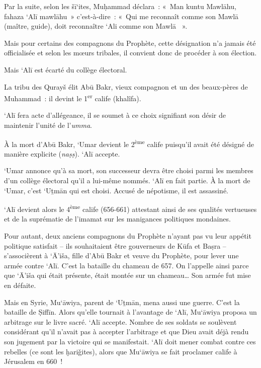 Par la suite, selon les šī`ites, Muḥammad déclara~: «~Man kuntu Mawlāhu,
fahaza `Alī mawlāhu~» c'est-à-dire~: «~Qui me reconnaît comme son Mawlā
(maître, guide), doit reconnaître `Ali comme son Mawlā ~».






Mais pour certains des compagnons du Prophète, cette désignation n'a
jamais été officialisée et selon les mœurs tribales, il convient donc de
procéder à son élection.

Mais `Alī est écarté du collège électoral.

La tribu des Qurayš élit Abū Bakr, vieux compagnon et un des beaux-pères
de Muhammad~: il devint le 1\textsuperscript{er} calife (khalîfa).

`Alī fera acte d'allégeance, il se soumet à ce choix signifiant son
désir de maintenir l'unité de l'\emph{umma}.

À la mort d'Abū Bakr, `Umar devient le 2\textsuperscript{ème} calife
puisqu'il avait été désigné de manière explicite (\emph{naṣṣ}). `Alī
accepte.

`Umar annonce qu'à sa mort, son successeur devra être choisi parmi les
membres d'un collège électoral qu'il a lui-même nommés. `Alī en fait
partie. À la mort de `Umar, c'est `Uṯmān qui est choisi. Accusé de
népotisme, il est assassiné.

`Alī devient alors le 4\textsuperscript{ème} calife (656-661) attestant
ainsi de ses qualités vertueuses et de la suprématie de l'imamat sur les
manigances politiques mondaines.

Pour autant, deux anciens compagnons du Prophète n'ayant pas vu leur
appétit politique satisfait -- ils souhaitaient être gouverneurs de Kūfa
et Baṣra -- s'associèrent à `Ā'iša, fille d'Abū Bakr et veuve du
Prophète, pour lever une armée contre `Alī. C'est la bataille du chameau
de 657. On l'appelle ainsi parce que `Ā'iša qui était présente, était
montée sur un chameau\ldots{} Son armée fut mise en défaite.








Mais en Syrie, Mu`āwiya, parent de `Uṯmān, mena aussi une guerre. C'est
la bataille de Ṣiffīn. Alors qu'elle tournait à l'avantage de `Alī,
Mu`āwiya proposa un arbitrage sur le livre sacré. `Alī accepte. Nombre
de ses soldats se soulèvent considérant qu'il n'avait pas à accepter
l'arbitrage et que Dieu avait déjà rendu son jugement par la victoire
qui se manifestait. `Alī doit mener combat contre ces rebelles (ce sont
les ḫariǧites), alors que Mu`āwiya se fait proclamer calife à Jérusalem
en 660~!


